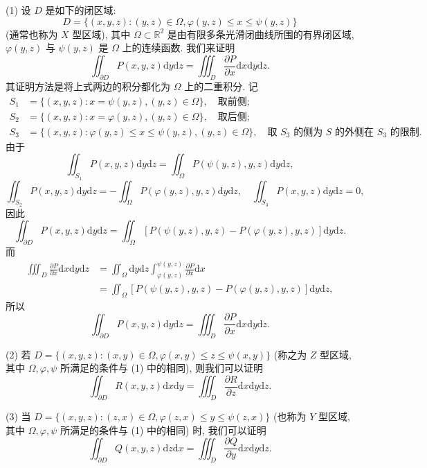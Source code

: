 \documentclass[UTF8, 12pt, fontset=fandol, oneside]{ctexart}
\begin{document}
(1) 设 $D$ 是如下的闭区域:
\[
  D=\{(x,y,z):(y,z)\in\Omega,\varphi(y,z)\leqslant x\leqslant\psi(y,z)\}
\]
(通常也称为 $X$ 型区域), 其中 $\Omega\subset\mathbb R^2$ 是由有限多条光滑闭曲线所围的有界闭区域, $\varphi(y,z)$ 与 $\psi(y,z)$ 是 $\Omega$ 上的连续函数. 我们来证明
\[
  \iint_{\partial D}P(x,y,z)\mathrm dy\mathrm dz
  =\iiint_D\frac{\partial P}{\partial x}\mathrm dx\mathrm dy\mathrm dz.
\]
其证明方法是将上式两边的积分都化为 $\Omega$ 上的二重积分. 记
\[
\begin{aligned}
  S_1&=\{(x,y,z):x=\psi(y,z),(y,z)\in\Omega\},\quad \text{取前侧};\\
  S_2&=\{(x,y,z):x=\varphi(y,z),(y,z)\in\Omega\},\quad \text{取后侧};\\
  S_3&=\{(x,y,z):\varphi(y,z)\leqslant x\leqslant\psi(y,z),(y,z)\in\Omega\},
    \quad \text{取 $S_3$ 的侧为 $S$ 的外侧在 $S_3$ 的限制}.
\end{aligned}
\]
由于
\[
  \iint_{S_1}P(x,y,z)\mathrm dy\mathrm dz
  =\iint_\Omega P(\psi(y,z),y,z)\mathrm dy\mathrm dz,
\]
\[
  \iint_{S_2}P(x,y,z)\mathrm dy\mathrm dz
  =-\iint_\Omega P(\varphi(y,z),y,z)\mathrm dy\mathrm dz,\quad
  \iint_{S_3}P(x,y,z)\mathrm dy\mathrm dz=0,
\]
因此
\[
  \iint_{\partial D}P(x,y,z)\mathrm dy\mathrm dz
  =\iint_\Omega[P(\psi(y,z),y,z)-P(\varphi(y,z),y,z)]\mathrm dy\mathrm dz.
\]
而
\[
\begin{aligned}
  \iiint_D\frac{\partial P}{\partial x}\mathrm dx\mathrm dy\mathrm dz
  &=\iint_\Omega\mathrm dy\mathrm dz
    \int_{\varphi(y,z)}^{\psi(y,z)}\frac{\partial P}{\partial x}\mathrm dx\\
  &=\iint_\Omega[P(\psi(y,z),y,z)-P(\varphi(y,z),y,z)]\mathrm dy\mathrm dz,
\end{aligned}
\]
所以
\[
  \iint_{\partial D}P(x,y,z)\mathrm dy\mathrm dz
  =\iiint_D\frac{\partial P}{\partial x}\mathrm dx\mathrm dy\mathrm dz.
\]

(2) 若 $D=\{(x,y,z):(x,y)\in\Omega,\varphi(x,y)\leqslant z\leqslant\psi(x,y)\}$ (称之为 $Z$ 型区域, 其中 $\Omega,\varphi,\psi$ 所满足的条件与 (1) 中的相同), 则我们可以证明
\[
  \iint_{\partial D}R(x,y,z)\mathrm dx\mathrm dy
  =\iiint_D\frac{\partial R}{\partial z}\mathrm dx\mathrm dy\mathrm dz.
\]

(3) 当 $D=\{(x,y,z):(z,x)\in\Omega,\varphi(z,x)\leqslant y\leqslant\psi(z,x)\}$ (也称为 $Y$ 型区域, 其中 $\Omega,\varphi,\psi$ 所满足的条件与 (1) 中的相同) 时, 我们可以证明
\[
  \iint_{\partial D}Q(x,y,z)\mathrm dz\mathrm dx
  =\iiint_D\frac{\partial Q}{\partial y}\mathrm dx\mathrm dy\mathrm dz.
\]
\end{document}

